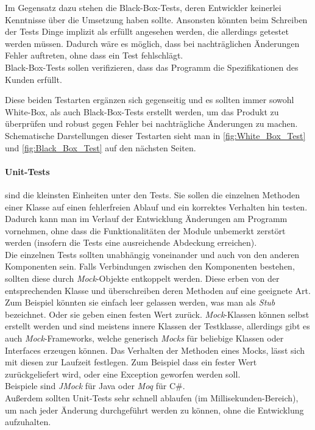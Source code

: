 Im Gegensatz dazu stehen die Black-Box-Tests, deren Entwickler keinerlei Kenntnisse über die Umsetzung haben sollte. Ansonsten könnten beim Schreiben der Tests Dinge implizit als erfüllt angesehen werden, die allerdings getestet werden müssen. Dadurch wäre es möglich, dass bei nachträglichen Änderungen Fehler auftreten, ohne dass ein Test fehlschlägt.\\
Black-Box-Tests sollen verifizieren, dass das Programm die Spezifikationen des Kunden erfüllt.

Diese beiden Testarten ergänzen sich gegenseitig und es sollten immer sowohl White-Box, als auch Black-Box-Tests erstellt werden, um das Produkt zu überprüfen und robust gegen Fehler bei nachträgliche Änderungen zu machen.\\
Schematische Darstellungen dieser Testarten sieht man in \autoref{fig:White_Box_Test} und \autoref{fig:Black_Box_Test} auf den nächsten Seiten.

\paragraph{Unit-Tests} sind die kleinsten Einheiten unter den Tests. Sie sollen die einzelnen Methoden einer Klasse auf einen fehlerfreien Ablauf und ein korrektes Verhalten hin testen. Dadurch kann man im Verlauf der Entwicklung Änderungen am Programm vornehmen, ohne dass die Funktionalitäten der Module unbemerkt zerstört werden (insofern die Tests eine ausreichende Abdeckung erreichen).\\
Die einzelnen Tests sollten unabhängig voneinander und auch von den anderen Komponenten sein. Falls Verbindungen zwischen den Komponenten bestehen, sollten diese durch \textit{Mock}-Objekte entkoppelt werden. Diese erben von der entsprechenden Klasse und überschreiben deren Methoden auf eine geeignete Art. Zum Beispiel könnten sie einfach leer gelassen werden, was man als \textit{Stub} bezeichnet. Oder sie geben einen festen Wert zurück. \textit{Mock}-Klassen können selbst erstellt werden und sind meistens innere Klassen der Testklasse, allerdings gibt es auch \textit{Mock}-Frameworks, welche generisch \textit{Mocks} für beliebige Klassen oder Interfaces erzeugen können. Das Verhalten der Methoden eines Mocks, lässt sich mit diesen zur Laufzeit festlegen. Zum Beispiel dass ein fester Wert zurückgeliefert wird, oder eine Exception geworfen werden soll.\\ Beispiele sind \textit{JMock} für Java oder \textit{Moq} für C\#.\\
Außerdem sollten Unit-Tests sehr schnell ablaufen (im Millisekunden-Bereich), um nach jeder Änderung durchgeführt werden zu können, ohne die Entwicklung aufzuhalten.

